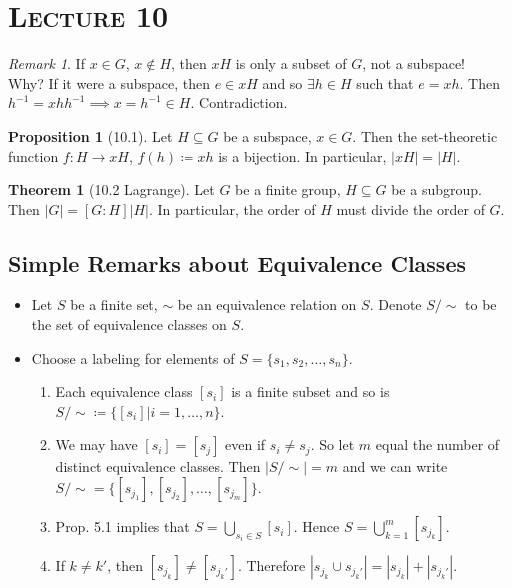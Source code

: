 \documentclass{article}
\newcommand{\union}{\cup}
\newcommand{\Union}{\bigcup}
\newcommand{\coleq}{\coloneqq}
\newcommand{\inverse}[1]{#1^{-1}}
\newcommand{\func}[3]{#1: #2 \to #3}
\theoremstyle{definition}
\newtheorem*{thm}{Theorem}
\newtheorem*{prop}{Proposition}
\theoremstyle{remark}
\newtheorem*{rmk}{Remark}
\begin{document}
    \section*{\textbf{\textsc{Lecture 10}}}{
        \begin{rmk}
            If $x\in G$, $x\notin H$, then $xH$ is only a subset of $G$, not a subspace!\\
            Why? If it were a subspace, then $e \in xH$ and so $\exists h \in H$ such that $e=xh$. Then $\inverse{h}=xh\inverse{h} \implies x=\inverse{h}\in H$. Contradiction.
        \end{rmk}
        
        \begin{prop}[10.1]
            Let $H \subseteq G$ be a subspace, $x \in G$. Then the set-theoretic function $\func{f}{H}{xH}$, $f(h) \coleq xh$ is a bijection. In particular, $|xH|=|H|$.
        \end{prop}
        
        \begin{thm}[10.2 Lagrange]
            Let $G$ be a finite group, $H \subseteq G$ be a subgroup. Then $|G|=[G:H]|H|$. In particular, the order of $H$ must divide the order of $G$. 
        \end{thm}
        
        \subsection*{Simple Remarks about Equivalence Classes}{
            \begin{itemize}
                \item Let $S$ be a finite set, $\sim $ be an equivalence relation on $S$. Denote $S/\sim $ to be the set of equivalence classes on $S$.
                \item Choose a labeling for elements of $S=\{s_1,s_2,\ldots,s_n\}$.
                \begin{enumerate}
                    \item Each equivalence class $[s_i]$ is a finite subset and so is $S/\sim \coleq\{[s_i]|i=1,\ldots,n\}$.
                    \item We may have $[s_i]=[s_j]$ even if $s_i\neq s_j$. So let $m$ equal the number of distinct equivalence classes. Then $|S/\sim |=m$ and we can write $S/\sim =\{[s_{j_1}],[s_{j_2}],\ldots,[s_{j_m}]\}$.
                    \item Prop. 5.1 implies that $S=\Union_{s_i \in S}[s_i]$. Hence $S=\Union_{k=1}^m [s_{j_k}]$.
                    \item If $k\neq k'$, then $[s_{j_k}] \neq [s_{j_k'}]$. Therefore $|s_{j_k} \union s_{j_k'}|=|s_{j_k}|+|s_{j_k'}|$.
                \end{enumerate}
            \end{itemize}
            
}}
\end{document}
